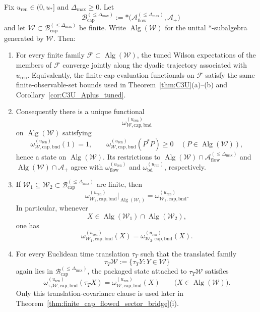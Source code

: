 \begin{corFspecialmix}\label{cor:finite_cap_mixed_family_packaging}
Fix $u_{\mathrm{ren}}\in(0,u_\ast]$ and $\Delta_{\max}\ge 0$.
Let
\[
\mathcal B_{\mathrm{cap}}^{(\le \Delta_{\max})}
:=
\ast\!\bigl(\mathcal A_{\mathrm{flow}}^{(\le \Delta_{\max})},\mathcal A_+\bigr)
\]
and let $\mathcal W\subset \mathcal B_{\mathrm{cap}}^{(\le \Delta_{\max})}$ be finite.
Write $\operatorname{Alg}(\mathcal W)$ for the unital $\ast$-subalgebra generated by $\mathcal W$.
Then:
\begin{enumerate}[label=(\roman*),leftmargin=2.3em]
\item For every finite family $\mathcal F\subset \operatorname{Alg}(\mathcal W)$, the tuned Wilson expectations of the members of $\mathcal F$ converge jointly along the dyadic trajectory associated with $u_{\mathrm{ren}}$.
Equivalently, the finite-cap evaluation functionals on $\mathcal F$ satisfy the same finite-observable-set bounds used in Theorem~\ref{thm:C3U}(a)--(b) and Corollary~\ref{cor:C3U_Aplus_tuned}.

\item Consequently there is a unique functional
\[
\omega_{\mathcal W,\mathrm{cap,bnd}}^{(u_{\mathrm{ren}})}
\]
on $\operatorname{Alg}(\mathcal W)$ satisfying
\[
\omega_{\mathcal W,\mathrm{cap,bnd}}^{(u_{\mathrm{ren}})}(1)=1,
\qquad
\omega_{\mathcal W,\mathrm{cap,bnd}}^{(u_{\mathrm{ren}})}(P^\ast P)\ge 0
\quad
(P\in \operatorname{Alg}(\mathcal W)),
\]
hence a state on $\operatorname{Alg}(\mathcal W)$.
Its restrictions to
$\operatorname{Alg}(\mathcal W)\cap \mathcal A_{\mathrm{flow}}^{(\le \Delta_{\max})}$ and
$\operatorname{Alg}(\mathcal W)\cap \mathcal A_+$ agree with
$\omega_{\mathrm{flow}}^{(u_{\mathrm{ren}})}$ and
$\omega_{\mathrm{bd}}^{(u_{\mathrm{ren}})}$, respectively.

\item If $\mathcal W_1\subseteq \mathcal W_2\subset \mathcal B_{\mathrm{cap}}^{(\le \Delta_{\max})}$ are finite, then
\[
\omega_{\mathcal W_2,\mathrm{cap,bnd}}^{(u_{\mathrm{ren}})}\big|_{\operatorname{Alg}(\mathcal W_1)}
=
\omega_{\mathcal W_1,\mathrm{cap,bnd}}^{(u_{\mathrm{ren}})}.
\]
In particular, whenever
\[
X\in \operatorname{Alg}(\mathcal W_1)\cap \operatorname{Alg}(\mathcal W_2),
\]
one has
\[
\omega_{\mathcal W_1,\mathrm{cap,bnd}}^{(u_{\mathrm{ren}})}(X)
=
\omega_{\mathcal W_2,\mathrm{cap,bnd}}^{(u_{\mathrm{ren}})}(X).
\]

\item For every Euclidean time translation $\tau_T$ such that the translated family
\[
\tau_T\mathcal W:=\{\tau_TY:Y\in \mathcal W\}
\]
again lies in $\mathcal B_{\mathrm{cap}}^{(\le \Delta_{\max})}$, the packaged state attached to $\tau_T\mathcal W$ satisfies
\[
\omega_{\tau_T\mathcal W,\mathrm{cap,bnd}}^{(u_{\mathrm{ren}})}(\tau_TX)
=
\omega_{\mathcal W,\mathrm{cap,bnd}}^{(u_{\mathrm{ren}})}(X)
\qquad
\bigl(X\in \operatorname{Alg}(\mathcal W)\bigr).
\]
Only this translation-covariance clause is used later in Theorem~\ref{thm:finite_cap_flowed_sector_bridge}(i).
\end{enumerate}
\end{corFspecialmix}

